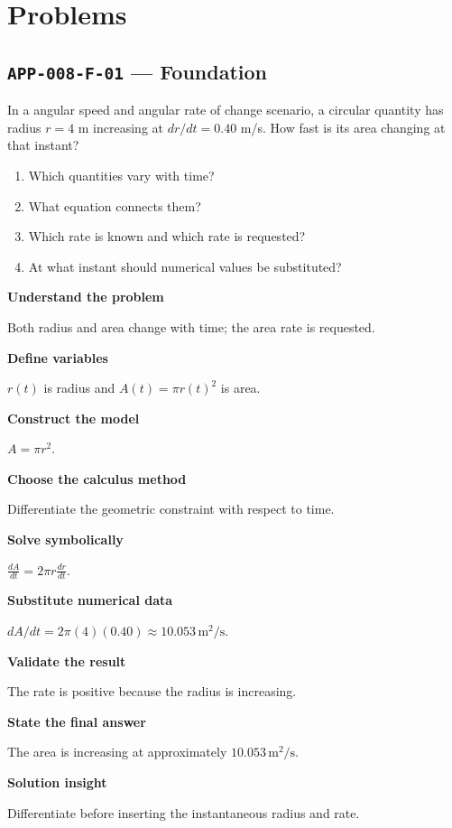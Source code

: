 \documentclass[11pt]{book}
\newcommand{\pid}[1]{\texttt{#1}}
\begin{document}
\section*{Problems}
\subsection*{\pid{APP-008-F-01} — Foundation}
\begin{problembox}
In a angular speed and angular rate of change scenario, a circular quantity has radius $r=4$ m increasing at $dr/dt=0.40$ m/s. How fast is its area changing at that instant?
\end{problembox}
\begin{promptbox}\begin{enumerate}
\item Which quantities vary with time?
\item What equation connects them?
\item Which rate is known and which rate is requested?
\item At what instant should numerical values be substituted?
\end{enumerate}\end{promptbox}
\begin{solutionbox}
\textbf{Understand the problem}\par Both radius and area change with time; the area rate is requested.\par\medskip
\textbf{Define variables}\par $r(t)$ is radius and $A(t)=\pi r(t)^2$ is area.\par\medskip
\textbf{Construct the model}\par $A=\pi r^2$.\par\medskip
\textbf{Choose the calculus method}\par Differentiate the geometric constraint with respect to time.\par\medskip
\textbf{Solve symbolically}\par $\frac{dA}{dt}=2\pi r\frac{dr}{dt}$.\par\medskip
\textbf{Substitute numerical data}\par $dA/dt=2\pi(4)(0.40)\approx 10.053\,\mathrm{m^2/s}$.\par\medskip
\textbf{Validate the result}\par The rate is positive because the radius is increasing.\par\medskip
\textbf{State the final answer}\par The area is increasing at approximately $10.053\,\mathrm{m^2/s}$.\par\medskip
\textbf{Solution insight}\par Differentiate before inserting the instantaneous radius and rate.\par\medskip
\end{solutionbox}
\end{document}
